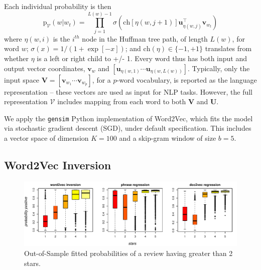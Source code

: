 \documentclass[11pt]{article}
\begin{document}
Each individual probability is then
\begin{equation} \label{eq:neuralnet}
\mathrm{p}_{\mathcal{V}}(w | w_t) =\!\!\!
 \prod_{j=1}^{L(w)-1} \!\!\!\sigma\!\left( \mathrm{ch}\left[\eta(w,j+1)\right] \mathbf{u}_{\eta(w,j)}^\top \mathbf{v}_{w_t} \right) 
\end{equation}
where $\eta(w,i)$ is the $i^{th}$ node in the Huffman tree path, of  length $L(w)$, for word $w$; $\sigma(x) = 1/(1 + \exp[-x])$; and $\mathrm{ch}(\eta)
\in \{-1,+1\}$ translates from whether $\eta$ is a left or right child to +/-
1.  Every word thus has both input and output vector coordinates,
$\mathbf{v}_w$ and $[\mathbf{u}_{\eta(w,1)} \cdots \mathbf{u}_{\eta(w,L(w))}]$.
Typically, only the input space $\mathbf{V} = [\mathbf{v}_{w_1} \cdots \mathbf{v}_{w_p}]$,
for a $p$-word vocabulary, is reported as the  language
representation -- these vectors are used as input for NLP tasks.    However,
the full representation $\mathcal{V}$ includes mapping from each word to both
$\mathbf{V}$ and $\mathbf{U}$.

We apply the
\texttt{gensim} Python implementation of Word2Vec, which fits the model via stochastic gradient descent (SGD),  under default specification.  This includes a vector space of dimension $K=100$ and a skip-gram window of size $b=5$.  

\subsection{Word2Vec Inversion}


\begin{figure}

\includegraphics[width=1\textwidth]{../graphs/coarseprob_bystar}
\caption{\label{pic:coarseprob} Out-of-Sample fitted probabilities of a review having greater than 2 stars. 
}
\end{figure}
 
\end{document}
